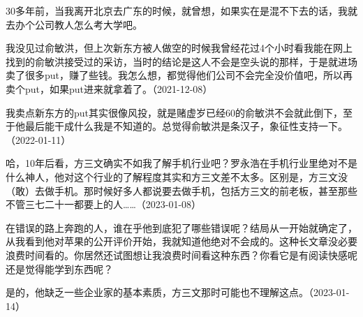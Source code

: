 30多年前，当我离开北京去广东的时候，就曾想，如果实在是混不下去的话，我就去办个公司教人怎么考大学吧。

我没见过俞敏洪，但上次新东方被人做空的时候我曾经花过4个小时看我能在网上找到的俞敏洪接受过的采访，当时的结论是这人不会是空头说的那样，于是就进场卖了很多put，赚了些钱。我怎么想，都觉得他们公司不会完全没价值吧，所以再卖个put，如果put进来就拿着了。（2021-12-08）

我卖点新东方的put其实很像风投，就是赌虚岁已经60的俞敏洪不会就此倒下，至于他最后能干成什么我是不知道的。总觉得俞敏洪是条汉子，象征性支持一下。（2022-01-11）

哈，10年后看，方三文确实不如我了解手机行业吧？罗永浩在手机行业里绝对不是什么神人，他对这个行业的了解程度其实和方三文差不太多。区别是，方三文没（敢）去做手机。那时候好多人都说要去做手机，包括方三文的前老板，甚至那些不管三七二十一都要上的人……（2023-01-08）


在错误的路上奔跑的人，谁在乎他到底犯了哪些错误呢？结局从一开始就确定了，从我看到他对苹果的公开评价开始，我就知道他绝对不会成的。这种长文章没必要浪费时间看的。你居然还试图想让我浪费时间看这种东西？你看它是有阅读快感呢还是觉得能学到东西呢？


是的，他缺乏一些企业家的基本素质，方三文那时可能也不理解这点。（2023-01-14）
